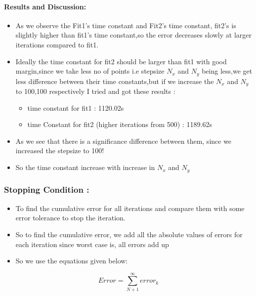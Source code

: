 \documentclass[a4paper,10pt]{article}
\providecommand{\tightlist}{%
      \setlength{\itemsep}{0pt}\setlength{\parskip}{0pt}}
\begin{document}
    \paragraph{Results and Discussion:}\label{results-and-discussion}

\begin{itemize}
\tightlist
\item
  As we observe the Fit1's time constant and Fit2's time constant,
  fit2's is slightly higher than fit1's time constant,so the error
  decreases slowly at larger iterations compared to fit1.
\item
  Ideally the time constant for fit2 should be larger than fit1 with
  good margin,since we take less no of points i.e stepsize \(N_x\) and
  \(N_y\) being less,we get less difference between their time
  constants,but if we increase the \(N_x\) and \(N_y\) to 100,100
  respectively I tried and got these results :

  \begin{itemize}
  \tightlist
  \item
    time constant for fit1 : 1120.02s
  \item
    time Constant for fit2 (higher iterations from 500) : 1189.62s
  \end{itemize}
\item
  As we see that there is a significance difference between them, since
  we increased the stepsize to 100!
\item
  So the time constant increase with increase in \(N_x\) and \(N_y\)
\end{itemize}

    \subsubsection{Stopping Condition :}\label{stopping-condition}

\begin{itemize}
\tightlist
\item
  To find the cumulative error for all iterations and compare them with
  some error tolerance to stop the iteration.
\item
  So to find the cumulative error, we add all the absolute values of
  errors for each iteration since worst case is, all errors add up
\item
  So we use the equations given below:
\end{itemize}

\begin{equation}
    Error = \sum_{N+1}^{\infty}error_k
  \end{equation}
\end{document}
